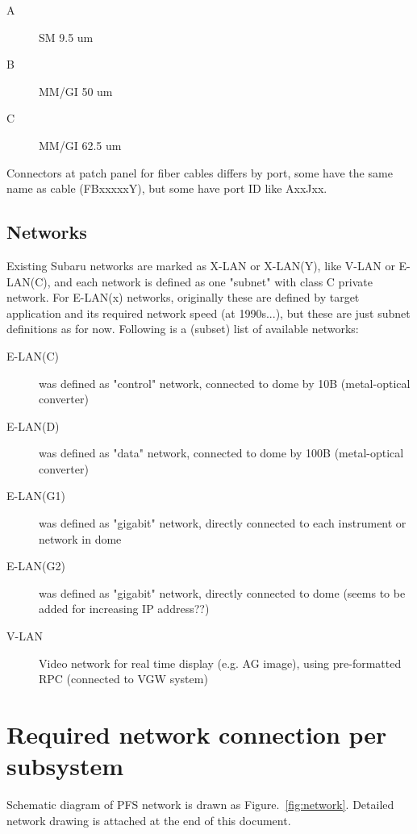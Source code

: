 \documentclass[a4paper,notitlepage]{article}
\begin{document}
\begin{description}
  \item[A] SM 9.5 um
  \item[B] MM/GI 50 um 
  \item[C] MM/GI 62.5 um
\end{description}

Connectors at patch panel for fiber cables differs by port, 
some have the same name as cable (FBxxxxxY),
but some have port ID like AxxJxx. 

\subsection{Networks}

Existing Subaru networks are marked as X-LAN or X-LAN(Y), like V-LAN or 
E-LAN(C), and each network is defined as one "subnet" with class C private 
network. 
For E-LAN(x) networks, originally these are defined by target application 
and its required network speed (at 1990s...), but these are just subnet 
definitions as for now. 
Following is a (subset) list of available networks: 

\begin{description}
  \item[E-LAN(C)] was defined as "control" network, connected to dome by 10B 
    (metal-optical converter)
  \item[E-LAN(D)] was defined as "data" network, connected to dome by 100B 
    (metal-optical converter)
  \item[E-LAN(G1)] was defined as "gigabit" network, directly connected to 
    each instrument or network in dome
  \item[E-LAN(G2)] was defined as "gigabit" network, directly connected to 
    dome (seems to be added for increasing IP address??)
  \item[V-LAN] Video network for real time display (e.g. AG image),
    using pre-formatted RPC (connected to VGW system)
\end{description}

\section{Required network connection per subsystem}

Schematic diagram of PFS network is drawn as Figure.~\ref{fig:network}.
Detailed network drawing is attached at the end of this document. 
\end{document}
